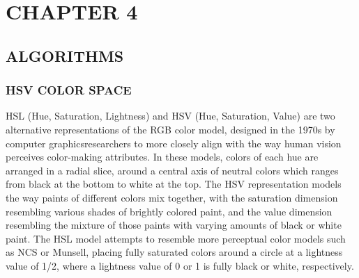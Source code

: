 
\chapter{CHAPTER 4}



\section{ALGORITHMS}

\subsection{HSV COLOR SPACE}
HSL (Hue, Saturation, Lightness) and HSV (Hue, Saturation, Value) are two alternative representations of the RGB color model, designed in the 1970s by computer graphicsresearchers to more closely align with the way human vision perceives color-making attributes. In these models, colors of each hue are arranged in a radial slice, around a central axis of neutral colors which ranges from black at the bottom to white at the top. The HSV representation models the way paints of different colors mix together, with the saturation dimension resembling various shades of brightly colored paint, and the value dimension resembling the mixture of those paints with varying amounts of black or white paint. The HSL model attempts to resemble more perceptual color models such as NCS or Munsell, placing fully saturated colors around a circle at a lightness value of 1/2, where a lightness value of 0 or 1 is fully black or white, respectively.

